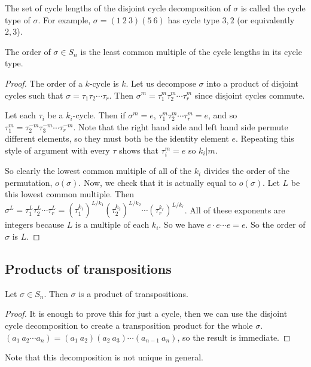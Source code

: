 The set of cycle lengths of the disjoint cycle decomposition of \(\sigma\) is called the cycle type of \(\sigma\).
For example, \(\sigma = (1\ 2\ 3)(5\ 6)\) has cycle type \(3, 2\) (or equivalently \(2, 3\)).

\begin{theorem}
	The order of \(\sigma \in S_n\) is the least common multiple of the cycle lengths in its cycle type.
\end{theorem}
\begin{proof}
	The order of a \(k\)-cycle is \(k\).
	Let us decompose \(\sigma\) into a product of disjoint cycles such that \(\sigma = \tau_1 \tau_2 \cdots \tau_r\).
	Then \(\sigma^m = \tau_1^m \tau_2^m \cdots \tau_r^m\) since disjoint cycles commute.

	Let each \(\tau_i\) be a \(k_i\)-cycle.
	Then if \(\sigma^m = e\), \(\tau_1^m \tau_2^m \cdots \tau_r^m = e\), and so \(\tau_1^m = \tau_2^{-m} \tau_3^{-m} \cdots \tau_r^{-m}\).
	Note that the right hand side and left hand side permute different elements, so they must both be the identity element \(e\).
	Repeating this style of argument with every \(\tau\) shows that \(\tau_i^m = e\) so \(k_i | m\).

	So clearly the lowest common multiple of all of the \(k_i\) divides the order of the permutation, \(o(\sigma)\).
	Now, we check that it is actually equal to \(o(\sigma)\).
	Let \(L\) be this lowest common multiple.
	Then \(\sigma^L = \tau_1^L \tau_2^L \cdots \tau_r^L = (\tau_1^{k_1})^{L/k_1} (\tau_2^{k_2})^{L/k_2} \cdots (\tau_r^{k_r})^{L/k_r}\).
	All of these exponents are integers because \(L\) is a multiple of each \(k_i\).
	So we have \(e \cdot e \cdots e = e\).
	So the order of \(\sigma\) is \(L\).
\end{proof}

\subsection{Products of transpositions}
\begin{proposition}
	Let \(\sigma \in S_n\).
	Then \(\sigma\) is a product of transpositions.
\end{proposition}
\begin{proof}
	It is enough to prove this for just a cycle, then we can use the disjoint cycle decomposition to create a transposition product for the whole \(\sigma\).
	\((a_1\ a_2\cdots a_n) = (a_1\ a_2)(a_2\ a_3)\cdots(a_{n-1}\ a_n)\), so the result is immediate.
\end{proof}
Note that this decomposition is not unique in general.

